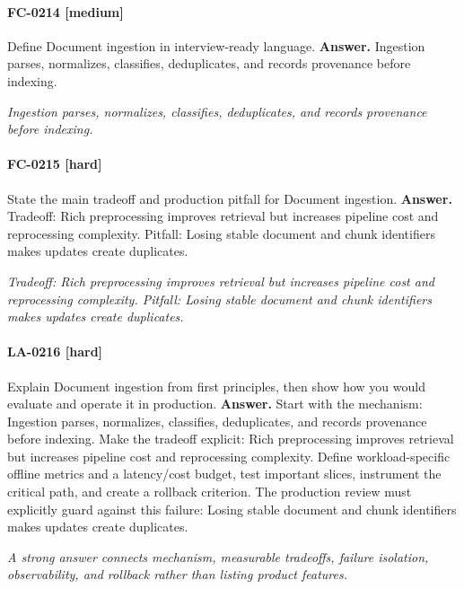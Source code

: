 \paragraph{FC-0214 [medium]} Define Document ingestion in interview-ready language.
\noindent\textbf{Answer.} Ingestion parses, normalizes, classifies, deduplicates, and records provenance before indexing.
\par\textit{Ingestion parses, normalizes, classifies, deduplicates, and records provenance before indexing.}
\paragraph{FC-0215 [hard]} State the main tradeoff and production pitfall for Document ingestion.
\noindent\textbf{Answer.} Tradeoff: Rich preprocessing improves retrieval but increases pipeline cost and reprocessing complexity. Pitfall: Losing stable document and chunk identifiers makes updates create duplicates.
\par\textit{Tradeoff: Rich preprocessing improves retrieval but increases pipeline cost and reprocessing complexity. Pitfall: Losing stable document and chunk identifiers makes updates create duplicates.}
\paragraph{LA-0216 [hard]} Explain Document ingestion from first principles, then show how you would evaluate and operate it in production.
\noindent\textbf{Answer.} Start with the mechanism: Ingestion parses, normalizes, classifies, deduplicates, and records provenance before indexing. Make the tradeoff explicit: Rich preprocessing improves retrieval but increases pipeline cost and reprocessing complexity. Define workload-specific offline metrics and a latency/cost budget, test important slices, instrument the critical path, and create a rollback criterion. The production review must explicitly guard against this failure: Losing stable document and chunk identifiers makes updates create duplicates.
\par\textit{A strong answer connects mechanism, measurable tradeoffs, failure isolation, observability, and rollback rather than listing product features.}

